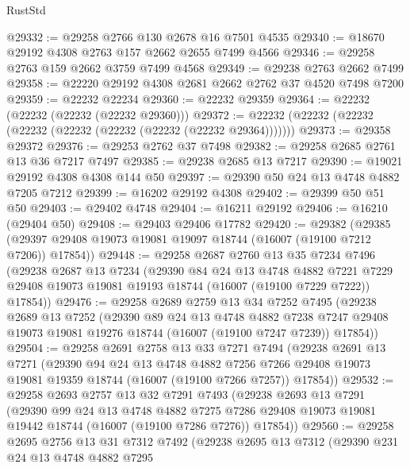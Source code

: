 \begin{lexlean}{RustStd}
\begin{coremodule}
@29332 := @29258 @2766 @130 @2678 @16 @7501 @4535
@29340 := @18670 @29192 @4308 @2763 @157 @2662 @2655 @7499 @4566
@29346 := @29258 @2763 @159 @2662 @3759 @7499 @4568
@29349 := @29238 @2763 @2662 @7499
@29358 := @22220 @29192 @4308 @2681 @2662 @2762 @37 @4520 @7498 @7200
@29359 := @22232 @22234
@29360 := @22232 @29359
@29364 := @22232 (@22232 (@22232 (@22232 @29360)))
@29372 := @22232 (@22232 (@22232 (@22232 (@22232 (@22232 (@22232 (@22232 @29364)))))))
@29373 := @29358 @29372
@29376 := @29253 @2762 @37 @7498
@29382 := @29258 @2685 @2761 @13 @36 @7217 @7497
@29385 := @29238 @2685 @13 @7217
@29390 := @19021 @29192 @4308 @4308 @144 @50
@29397 := @29390 @50 @24 @13 @4748 @4882 @7205 @7212
@29399 := @16202 @29192 @4308
@29402 := @29399 @50 @51 @50
@29403 := @29402 @4748
@29404 := @16211 @29192
@29406 := @16210 (@29404 @50)
@29408 := @29403 @29406 @17782
@29420 := @29382
    (@29385 (@29397 @29408 @19073 @19081 @19097 @18744 (@16007 (@19100 @7212 @7206)) @17854))
@29448 := @29258
    @2687
    @2760
    @13
    @35
    @7234
    @7496
    (@29238
      @2687
      @13
      @7234
      (@29390
        @84
        @24
        @13
        @4748
        @4882
        @7221
        @7229
        @29408
        @19073
        @19081
        @19193
        @18744
        (@16007 (@19100 @7229 @7222))
        @17854))
@29476 := @29258
    @2689
    @2759
    @13
    @34
    @7252
    @7495
    (@29238
      @2689
      @13
      @7252
      (@29390
        @89
        @24
        @13
        @4748
        @4882
        @7238
        @7247
        @29408
        @19073
        @19081
        @19276
        @18744
        (@16007 (@19100 @7247 @7239))
        @17854))
@29504 := @29258
    @2691
    @2758
    @13
    @33
    @7271
    @7494
    (@29238
      @2691
      @13
      @7271
      (@29390
        @94
        @24
        @13
        @4748
        @4882
        @7256
        @7266
        @29408
        @19073
        @19081
        @19359
        @18744
        (@16007 (@19100 @7266 @7257))
        @17854))
@29532 := @29258
    @2693
    @2757
    @13
    @32
    @7291
    @7493
    (@29238
      @2693
      @13
      @7291
      (@29390
        @99
        @24
        @13
        @4748
        @4882
        @7275
        @7286
        @29408
        @19073
        @19081
        @19442
        @18744
        (@16007 (@19100 @7286 @7276))
        @17854))
@29560 := @29258
    @2695
    @2756
    @13
    @31
    @7312
    @7492
    (@29238
      @2695
      @13
      @7312
      (@29390
        @231
        @24
        @13
        @4748
        @4882
        @7295

\end{coremodule}
\end{lexlean}
